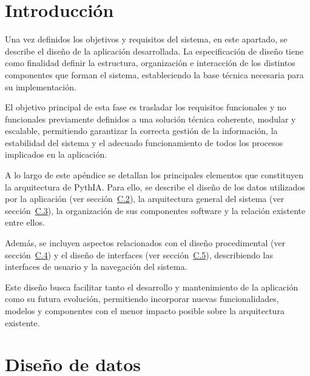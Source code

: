 
\section{Introducción}

Una vez definidos los objetivos y requisitos del sistema, en este apartado, se describe el diseño de la aplicación desarrollada. La especificación de diseño tiene como finalidad definir la estructura, organización e interacción de los distintos componentes que forman el sistema, estableciendo la base técnica necesaria para su implementación.

El objetivo principal de esta fase es trasladar los requisitos funcionales y no funcionales previamente definidos a una solución técnica coherente, modular y escalable, permitiendo garantizar la correcta gestión de la información, la estabilidad del sistema y el adecuado funcionamiento de todos los procesos implicados en la aplicación.

A lo largo de este apéndice se detallan los principales elementos que constituyen la arquitectura de PythIA. Para ello, se describe el diseño de los datos utilizados por la aplicación (ver sección~\hyperref[dis:dtos]{C.2}), la arquitectura general del sistema (ver sección~\hyperref[dis:arc]{C.3}), la organización de sus componentes software y la relación existente entre ellos.

Además, se incluyen aspectos relacionados con el diseño procedimental (ver sección~\hyperref[dis:proc]{C.4}) y el diseño de interfaces (ver sección~\hyperref[dis:int]{C.5}), describiendo las interfaces de usuario y la navegación del sistema.

Este diseño busca facilitar tanto el desarrollo y mantenimiento de la aplicación como su futura evolución, permitiendo incorporar nuevas funcionalidades, modelos y componentes con el menor impacto posible sobre la arquitectura existente.

\section{Diseño de datos} \label{dis:dtos}

